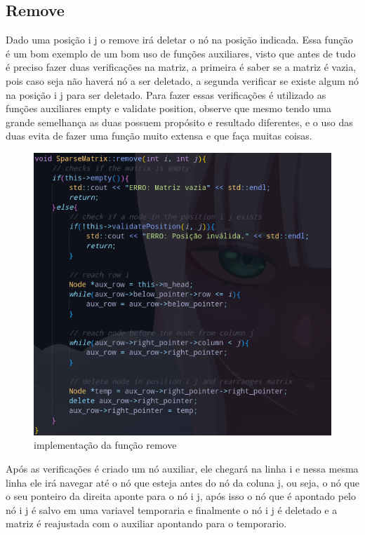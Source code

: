\documentclass[a4paper,12pt]{article}
\begin{document}
\subsection{Remove}
Dado uma posição i j o remove irá deletar o nó na posição indicada.
Essa função é um bom exemplo de um bom uso de funções auxiliares, visto que antes de tudo é preciso fazer duas verificações na matriz, a primeira é saber se a matriz é vazia, pois caso seja não haverá nó a ser deletado, a segunda verificar se existe algum nó na posição i j para ser deletado. Para fazer essas verificações é utilizado as funções auxiliares empty e validate position, observe que mesmo tendo uma grande semelhança as duas possuem propósito e resultado diferentes, e o uso das duas evita de fazer uma função muito extensa e que faça muitas coisas.

\begin{figure}[h]
\centering
\includegraphics[width=1\textwidth]{Imagens/sparsematrixCPP/sparsematrix-remove.png}
\caption{\label{fig:remove} implementação da função remove}
\end{figure}

Após as verificações é criado um nó auxiliar, ele chegará na linha i e nessa mesma linha ele irá navegar até o nó que esteja antes do nó da coluna j, ou seja, o nó que o seu ponteiro da direita aponte para o nó i j, após isso o nó que é apontado pelo nó i j é salvo em uma variavel temporaria e finalmente o nó i j é deletado e a matriz é reajustada com o auxiliar apontando para o temporario.
\end{document}
